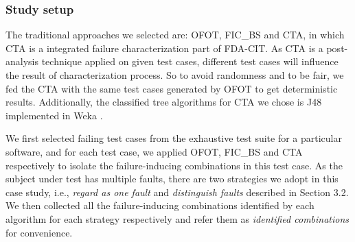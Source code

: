 \documentclass{sig-alternate}
\begin{document}
\subsubsection{Study setup}
The traditional approaches we selected are: OFOT\cite{nie2011minimal}, FIC\_BS \cite{zhang2011characterizing} and CTA\cite{yilmaz2006covering}, in which CTA is a integrated failure characterization part of FDA-CIT\cite{yilmaz2013reducing}. As CTA is a post-analysis technique applied on given test cases, different test cases will influence the result of characterization process. So to avoid randomness and to be fair, we fed the CTA with the same test cases generated by OFOT to get deterministic results. Additionally, the classified tree algorithms for CTA we chose is J48 implemented in Weka \cite{hall2009weka}. %


We first selected failing test cases from the exhaustive test suite for a particular software, and for each test case, we applied OFOT, FIC\_BS and CTA respectively to isolate the failure-inducing combinations in this test case.  As the subject under test has multiple faults, there are two strategies we adopt in this case study, i.e., \emph{regard as one fault} and \emph{distinguish faults} described in Section 3.2. We then collected all the failure-inducing combinations identified by each algorithm for each strategy respectively and refer them as \emph{identified combinations} for convenience.
%
%
\end{document}
